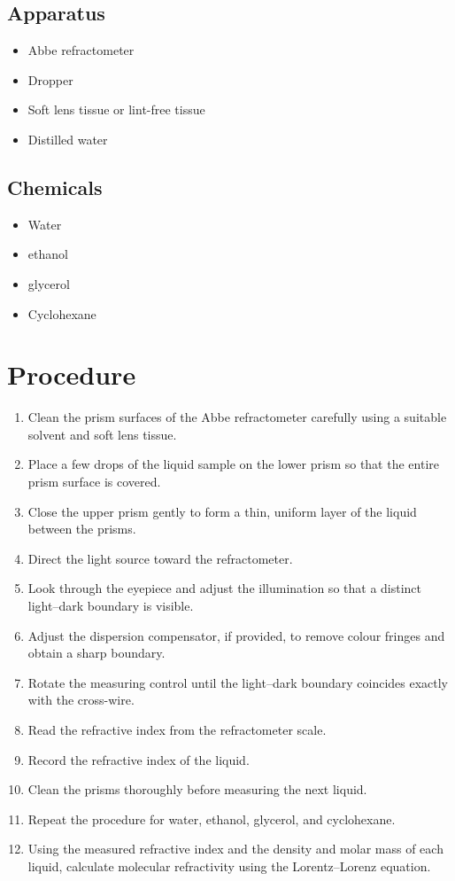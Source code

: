 \documentclass[12pt,a4paper]{article}
\begin{document}
\subsection*{Apparatus}
\begin{itemize}
    \item Abbe refractometer
    \item Dropper
    \item Soft lens tissue or lint-free tissue
    \item Distilled water
\end{itemize}

\subsection*{Chemicals}
\begin{itemize}
    \item Water
    \item ethanol
    \item glycerol
    \item Cyclohexane
\end{itemize}

\section*{Procedure}

\begin{enumerate}
    \item Clean the prism surfaces of the Abbe refractometer carefully using a suitable solvent and soft lens tissue.
    \item Place a few drops of the liquid sample on the lower prism so that the entire prism surface is covered.
    \item Close the upper prism gently to form a thin, uniform layer of the liquid between the prisms.
    \item Direct the light source toward the refractometer.
    \item Look through the eyepiece and adjust the illumination so that a distinct light--dark boundary is visible.
    \item Adjust the dispersion compensator, if provided, to remove colour fringes and obtain a sharp boundary.
    \item Rotate the measuring control until the light--dark boundary coincides exactly with the cross-wire.
    \item Read the refractive index from the refractometer scale.
    \item Record the refractive index of the liquid.
    \item Clean the prisms thoroughly before measuring the next liquid.
    \item Repeat the procedure for water, ethanol, glycerol, and cyclohexane.
    \item Using the measured refractive index and the density and molar mass of each liquid, calculate molecular refractivity using the Lorentz--Lorenz equation.
\end{enumerate}
\end{document}
